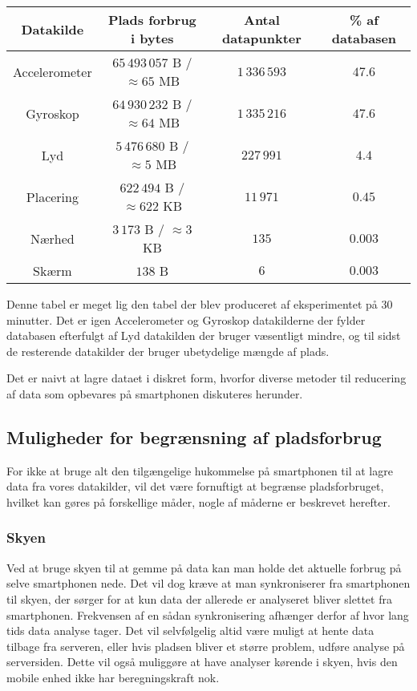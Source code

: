\begin{tabular}{|c|c|c|c|}
	\hline Datakilde	 & Plads forbrug i bytes	  			& Antal datapunkter 	& \% af databasen \\
	\hline Accelerometer & $65\,493\,057$ B / $\approx65$ MB   	& $1\,336\,593$    		& $47.6$ \\ 
	\hline Gyroskop 	 & $64\,930\,232$ B / $\approx64$ MB  	& $1\,335\,216$   		& $47.6$ \\ 
	\hline Lyd 		  	 & $5\,476\,680$ B / $\approx5$  MB  	& $227\,991$     		& $4.4$ \\ 
	\hline Placering 	 & $622\,494$ B	/ $\approx622$ KB		& $11\,971$      		& $0.45$ \\ 
	\hline Nærhed    	 & $3\,173$ B	/ $\approx3$ KB			& $135$ 				& $0.003$ \\ 
	\hline Skærm 		 & $138$ B          					& $6$          			& $0.003$ \\ 
	\hline 
\end{tabular} 

Denne tabel er meget lig den tabel der blev produceret af eksperimentet på 30 minutter.
Det er igen Accelerometer og Gyroskop datakilderne der fylder databasen efterfulgt af Lyd datakilden der bruger væsentligt mindre, og til sidst de resterende datakilder der bruger ubetydelige mængde af plads.

Det er naivt at lagre dataet i diskret form, hvorfor diverse metoder til reducering af data som opbevares på smartphonen diskuteres herunder.

\subsection{Muligheder for begrænsning af pladsforbrug}
For ikke at bruge alt den tilgængelige hukommelse på smartphonen til at lagre data fra vores datakilder, vil det være fornuftigt at begrænse pladsforbruget, hvilket kan gøres på forskellige måder, nogle af måderne er beskrevet herefter.

\subsubsection{Skyen}
Ved at bruge skyen til at gemme på data kan man holde det aktuelle forbrug på selve smartphonen nede.
Det vil dog kræve at man synkroniserer fra smartphonen til skyen, der sørger for at kun data der allerede er analyseret bliver slettet fra smartphonen. 
Frekvensen af en sådan synkronisering afhænger derfor af hvor lang tids data analyse tager.
Det vil selvfølgelig altid være muligt at hente data tilbage fra serveren, eller hvis pladsen bliver et større problem, udføre analyse på serversiden.
Dette vil også muliggøre at have analyser kørende i skyen, hvis den mobile enhed ikke har beregningskraft nok.

